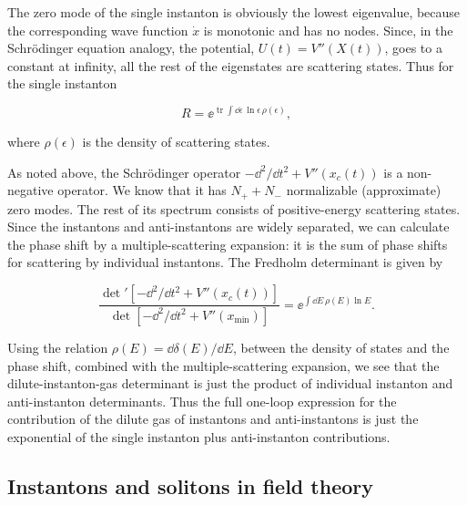 The zero mode of the single instanton is obviously the lowest eigenvalue,
because the corresponding wave function $\dot x$ is monotonic and has no nodes.
Since, in the Schrödinger equation analogy, the potential,
$U(t)=V''(X(t))$, goes to a constant at infinity, all the rest of the eigenstates
are scattering states. Thus for the single instanton

\[
  R=\ee^{\operatorname{tr}\int\dd\epsilon\,\ln\epsilon\,\rho(\epsilon)},
\]

where $\rho(\epsilon)$ is the density of scattering states.

As noted above, the Schrödinger operator
$-\dd^2/\dd t^2+V''(x_c(t))$ is a non-negative operator. We know that it has
$N_++N_-$ normalizable (approximate) zero modes. The rest of its spectrum
consists of positive-energy scattering states. Since the instantons and
anti-instantons are widely separated, we can calculate the phase shift by a
multiple-scattering expansion: it is the sum of phase shifts for scattering by
individual instantons. The Fredholm determinant is given by

\[
  \frac{\det'[-\dd^2/\dd t^2+V''(x_c(t))]}
  {\det[-\dd^2/\dd t^2+V''(x_{\min})]}
  =\ee^{\int\dd E\,\rho(E)\ln E}.
\]

Using the relation $\rho(E)=\dd\delta(E)/\dd E$, between the density of states
and the phase shift, combined with the multiple-scattering expansion, we see
that the dilute-instanton-gas determinant is just the product of individual
instanton and anti-instanton determinants. Thus the full one-loop expression for
the contribution of the dilute gas of instantons and anti-instantons is just the
exponential of the single instanton plus anti-instanton contributions.

\subsection{Instantons and solitons in field theory}

\setcounter{footnote}{4}
